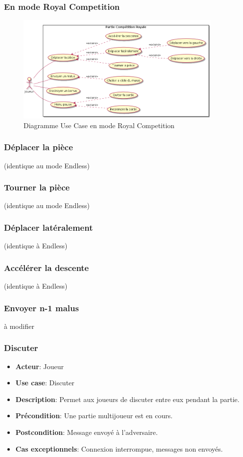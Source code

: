 \documentclass{article}
\begin{document}
\subsubsection{En mode Royal Competition}

\begin{figure}[!h]
    \centering
    \includegraphics[width=0.9\textwidth]{./uml/usescase/en-jeu/royal-competition.png}
    \caption{Diagramme Use Case en mode Royal Competition}
    \label{fig:Royal-Competition}
\end{figure}

\subsubsection*{Déplacer la pièce} (identique au mode Endless)
\subsubsection*{Tourner la pièce} (identique au mode Endless)
\subsubsection*{Déplacer latéralement} (identique à Endless)
\subsubsection*{Accélérer la descente} (identique à Endless)

\subsubsection*{Envoyer n-1 malus} 
à modifier 

\subsubsection*{Discuter}
\begin{itemize}
    \item \textbf{Acteur}: Joueur
    \item \textbf{Use case}: Discuter
    \item \textbf{Description}: Permet aux joueurs de discuter entre eux pendant la partie.
    \item \textbf{Précondition}: Une partie multijoueur est en cours.
    \item \textbf{Postcondition}: Message envoyé à l'adversaire.
    \item \textbf{Cas exceptionnels}: Connexion interrompue, messages non envoyés.
\end{itemize}
\end{document}
